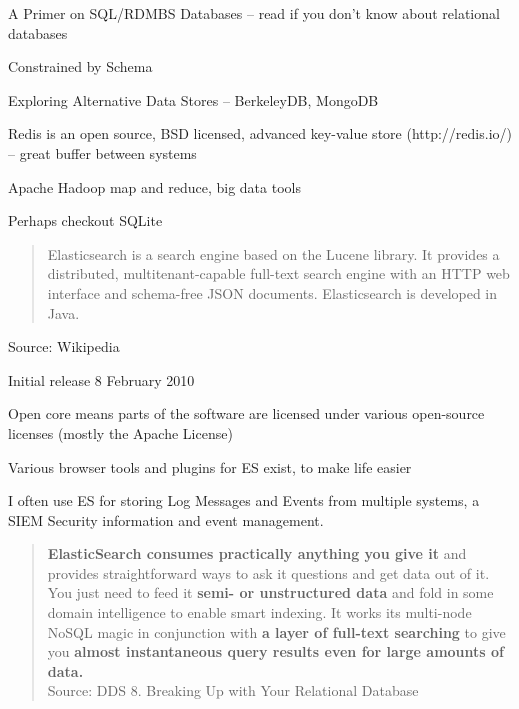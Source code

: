 \documentclass[Screen16to9,17pt]{foils}
\begin{document}
\begin{list2}
\item A Primer on SQL/RDMBS Databases -- read if you don't know about relational databases
\item Constrained by Schema
\item Exploring Alternative Data Stores -- BerkeleyDB, MongoDB
\item Redis is an open source, BSD licensed, advanced key-value store (http://redis.io/) -- great buffer between systems
\item Apache Hadoop  map and reduce, big data tools
\item Perhaps checkout SQLite  
\end{list2}



\begin{quote}
Elasticsearch is a search engine based on the Lucene library. It provides a distributed, multitenant-capable full-text search engine with an HTTP web interface and schema-free JSON documents. Elasticsearch is developed in Java.
\end{quote}

Source: Wikipedia 

\begin{list2}
\item Initial release	8 February 2010
\item Open core means parts of the software are licensed under various open-source licenses (mostly the Apache License)
\item Various browser tools and plugins for ES exist, to make life easier
\item I often use ES for storing Log Messages and Events from multiple systems, a SIEM Security information and event management.
\end{list2}




\begin{quote}\small
{\bf ElasticSearch consumes practically anything you give it} and provides straightforward ways to ask it questions and get data out of it. You just need to feed it {\bf semi- or unstructured data} and fold in some domain intelligence to enable smart indexing. It works its multi-node NoSQL magic in conjunction with {\bf a layer of full-text searching} to give you {\bf almost instantaneous query results even for large amounts of data.}\\
Source: DDS 8. Breaking Up with Your Relational Database
\end{quote}
\end{document}
